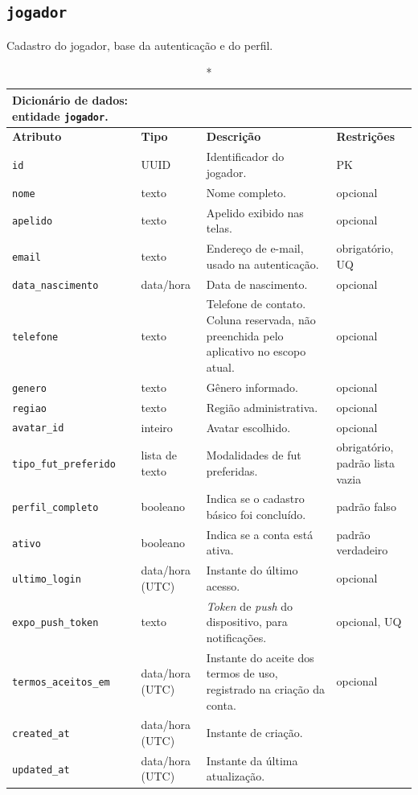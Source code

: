 \begin{apendicesenv}
    \subsection*{\texttt{jogador}}
    Cadastro do jogador, base da autenticação e do perfil.
    \begin{longtable}{p{2.5cm}p{2.1cm}p{5.8cm}p{2.9cm}}
    \caption*{Dicionário de dados: entidade \texttt{jogador}.}\\
        \hline
        \textbf{Atributo} & \textbf{Tipo} & \textbf{Descrição} & \textbf{Restrições} \\
        \hline
        \endhead
        \texttt{id} & UUID & Identificador do jogador. & PK \\
        \texttt{nome} & texto & Nome completo. & opcional \\
        \texttt{apelido} & texto & Apelido exibido nas telas. & opcional \\
        \texttt{email} & texto & Endereço de e-mail, usado na autenticação. & obrigatório, UQ \\
        \texttt{data\_nascimento} & data/hora & Data de nascimento. & opcional \\
        \texttt{telefone} & texto & Telefone de contato. Coluna reservada, não preenchida pelo aplicativo no escopo atual. & opcional \\
        \texttt{genero} & texto & Gênero informado. & opcional \\
        \texttt{regiao} & texto & Região administrativa. & opcional \\
        \texttt{avatar\_id} & inteiro & Avatar escolhido. & opcional \\
        \texttt{tipo\_fut\_preferido} & lista de texto & Modalidades de fut preferidas. & obrigatório, padrão lista vazia \\
        \texttt{perfil\_completo} & booleano & Indica se o cadastro básico foi concluído. & padrão falso \\
        \texttt{ativo} & booleano & Indica se a conta está ativa. & padrão verdadeiro \\
        \texttt{ultimo\_login} & data/hora (UTC) & Instante do último acesso. & opcional \\
        \texttt{expo\_push\_token} & texto & \textit{Token} de \textit{push} do dispositivo, para notificações. & opcional, UQ \\
        \texttt{termos\_aceitos\_em} & data/hora (UTC) & Instante do aceite dos termos de uso, registrado na criação da conta. & opcional \\
        \texttt{created\_at} & data/hora (UTC) & Instante de criação. & \\
        \texttt{updated\_at} & data/hora (UTC) & Instante da última atualização. & \\
        \hline
    \end{longtable}


\end{apendicesenv}
